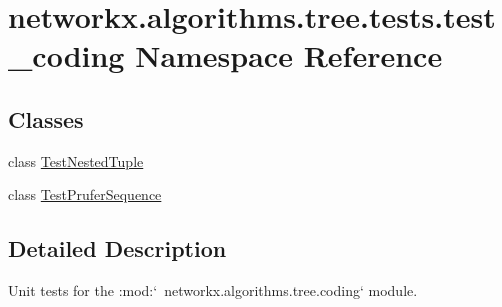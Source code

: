 \hypertarget{namespacenetworkx_1_1algorithms_1_1tree_1_1tests_1_1test__coding}{}\section{networkx.\+algorithms.\+tree.\+tests.\+test\+\_\+coding Namespace Reference}
\label{namespacenetworkx_1_1algorithms_1_1tree_1_1tests_1_1test__coding}
\subsection*{Classes}
\begin{DoxyCompactItemize}
\item 
class \hyperlink{classnetworkx_1_1algorithms_1_1tree_1_1tests_1_1test__coding_1_1TestNestedTuple}{Test\+Nested\+Tuple}
\item 
class \hyperlink{classnetworkx_1_1algorithms_1_1tree_1_1tests_1_1test__coding_1_1TestPruferSequence}{Test\+Prufer\+Sequence}
\end{DoxyCompactItemize}


\subsection{Detailed Description}
\begin{DoxyVerb}Unit tests for the :mod:`~networkx.algorithms.tree.coding` module.\end{DoxyVerb}
 
